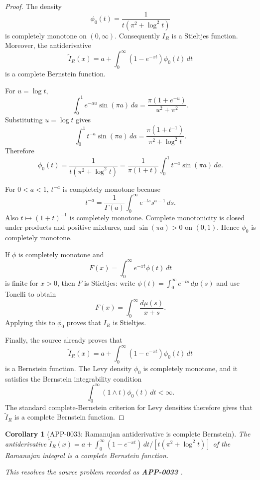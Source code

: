 \documentclass[11pt]{article}
\numberwithin{equation}{section}
\newtheorem{corollary}[theorem]{Corollary}
\theoremstyle{definition}
\theoremstyle{remark}
\newcommand{\1}{\mathbf 1}
\begin{document}
\begin{proof}
The density
\[
\phi_0(t)=\frac{1}{t(\pi^2+\log^2 t)}
\]
is completely monotone on \((0,\infty)\). Consequently \(I_R\) is a Stieltjes function. Moreover, the antiderivative
\[
\widetilde I_R(x)=a+\int_0^\infty (1-e^{-xt})\phi_0(t)\,dt
\]
is a complete Bernstein function.

For \(u=\log t\),
\[
\int_0^1 e^{-au}\sin(\pi a)\,da
=\frac{\pi(1+e^{-u})}{u^2+\pi^2}.
\]
Substituting \(u=\log t\) gives
\[
\int_0^1 t^{-a}\sin(\pi a)\,da
=\frac{\pi(1+t^{-1})}{\pi^2+\log^2 t}.
\]
Therefore
\[
\phi_0(t)
=\frac{1}{t(\pi^2+\log^2 t)}
=\frac{1}{\pi(1+t)}\int_0^1 t^{-a}\sin(\pi a)\,da.
\]

For \(0<a<1\), \(t^{-a}\) is completely monotone because
\[
t^{-a}=\frac1{\Gamma(a)}\int_0^\infty e^{-ts}s^{a-1}\,ds.
\]
Also \(t\mapsto(1+t)^{-1}\) is completely monotone. Complete monotonicity is closed under products and positive mixtures, and \(\sin(\pi a)>0\) on \((0,1)\). Hence \(\phi_0\) is completely monotone.

If \(\phi\) is completely monotone and
\[
F(x)=\int_0^\infty e^{-xt}\phi(t)\,dt
\]
is finite for \(x>0\), then \(F\) is Stieltjes: write \(\phi(t)=\int_0^\infty e^{-ts}\,d\mu(s)\) and use Tonelli to obtain
\[
F(x)=\int_0^\infty\frac{d\mu(s)}{x+s}.
\]
Applying this to \(\phi_0\) proves that \(I_R\) is Stieltjes.

Finally, the source already proves that
\[
\widetilde I_R(x)=a+\int_0^\infty (1-e^{-xt})\phi_0(t)\,dt
\]
is a Bernstein function. The Levy density \(\phi_0\) is completely monotone, and it satisfies the Bernstein integrability condition
\[
\int_0^\infty (1\wedge t)\phi_0(t)\,dt<\infty.
\]
The standard complete-Bernstein criterion for Levy densities therefore gives that \(\widetilde I_R\) is a complete Bernstein function.
\end{proof}

\begin{corollary}[APP-0033: Ramanujan antiderivative is complete Bernstein]
\label{res:ramanujan-antiderivative-complete-bernstein}
The antiderivative \(\widetilde I_R(x)=a+\int_0^\infty(1-e^{-xt})\,dt/[t(\pi^2+\log^2 t)]\) of the Ramanujan integral is a complete Bernstein function.



This resolves the source problem recorded as \textbf{APP-0033} \cite{mishra-swaminathan-ramanujan}.
\end{corollary}
\end{document}
